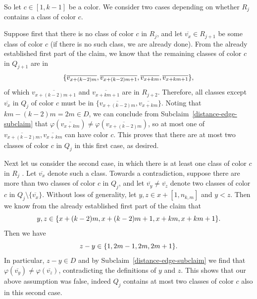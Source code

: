 \documentclass[a4paper,10pt,hidelinks]{amsart}
\newenvironment{claimproof}[1][\proofname]{\proof[#1]\renewcommand{\qedsymbol}{$\blacksquare$}}{\endproof}
\newenvironment{subclaimproof}[1][\proofname]{\proof[#1]\renewcommand{\qedsymbol}{$\blacklozenge$}}{\endproof}
\theoremstyle{definition}
\begin{document}
\begin{claimproof}[Proof of Claim~\ref{structure-claim} when $k \in \{6,8\}$]
\begin{subclaimproof}
            \noindent So let $c\in [1,k-1]$ be a color. We consider two cases depending on whether $R_j$ contains a class of color $c$.
            
            Suppose first that there is no class of color $c$ in $R_j$, and let $\overline{v_x} \in R_{j + 1}$ be some class of color $c$ (if there is no such class, we are already done). From the already established first part of the claim, we know that the remaining classes of color $c$ in $Q_{j + 1}$ are in 
            \begin{equation}\notag
                \{\overline{v_{x + (k - 2)m}}, \overline{v_{x + (k - 2)m + 1}}, \overline{v_{x + km}}, \overline{v_{x + km + 1}}\},
            \end{equation} 
            of which $\overline{v_{x + (k - 2)m + 1}}$ and $\overline{v_{x + km + 1}}$ are in $R_{j + 2}$. Therefore, all classes except $\overline{v_x}$ in $Q_j$ of color $c$ must be in $\{\overline{v_{x + (k - 2)m}}, \overline{v_{x + km}}\}$. Noting that $km - (k - 2)m = 2m \in D$, we can conclude from Subclaim~\ref{distance-edge-subclaim} that $\varphi(\overline{v_{x + km}}) \neq \varphi(\overline{v_{x + (k - 2)m}})$, so at most one of $\overline{v_{x + (k - 2)m}}, \overline{v_{x + km}}$ can have color $c$. This proves that there are at most two classes of color $c$ in $Q_j$ in this first case, as desired.

            Next let us consider the second case, in which there is at least one class of color $c$ in $R_j$ . Let $\overline{v_x}$ denote such a class. Towards a contradiction, suppose there are more than two classes of color $c$ in $Q_j$, and let $\overline{v_y}\neq \overline{v_z}$ denote two classes of color $c$ in $Q_j\setminus \{\overline{v_x}\}$. Without loss of generality, let $y, z \in x + [1, n_{k,m}]$ and $y < z$. Then we know from the already established first part of the claim that
            \begin{equation}\notag
                y, z \in \{x + (k - 2)m, x + (k - 2)m + 1, x + km, x + km + 1\}.
            \end{equation} 
            Then we have
            \begin{equation}\notag
                z - y \in \{1, 2m - 1, 2m, 2m + 1\}.
            \end{equation}
            In particular, $z - y \in D$ and by Subclaim~\ref{distance-edge-subclaim} we find that $\varphi(\overline{v_y}) \neq \varphi(\overline{v_z})$, contradicting the definitions of $y$ and $z$. This shows that our above assumption was false, indeed $Q_j$ contains at most two classes of color $c$ also in this second case.


\end{subclaimproof}
\end{claimproof}
\end{document}
